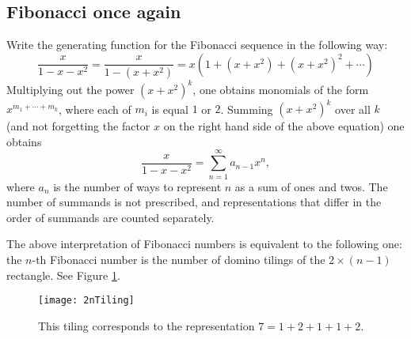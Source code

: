 \subsection{Fibonacci once again}
Write the generating function for the Fibonacci sequence in the following way:
\[
\frac{x}{1-x-x^2} = \frac{x}{1-(x+x^2)} = x( 1 + (x+x^2) + (x+x^2)^2 + \cdots)
\]
Multiplying out the power $(x+x^2)^k$, one obtains monomials of the form $x^{m_1+\cdots+m_k}$,
where each of $m_i$ is equal $1$ or $2$.
Summing $(x+x^2)^k$ over all $k$ (and not forgetting the factor $x$ on the right hand side of the above equation) one obtains
\[
\frac{x}{1-x-x^2} = \sum_{n=1}^\infty a_{n-1} x^n,
\]
where $a_n$ is the number of ways to represent $n$ as a sum of ones and twos.
The number of summands is not prescribed, and representations that differ in the order of summands are counted separately.

The above interpretation of Fibonacci numbers is equivalent to the following one:
the $n$-th Fibonacci number is the number of domino tilings of the $2 \times (n-1)$ rectangle.
See Figure \ref{fig:FibDomino}.

\begin{figure}[ht]
\begin{center}
\texttt{[image: 2nTiling]}
\end{center}
\caption{This tiling corresponds to the representation $7 = 1 + 2 + 1 + 1 + 2$.}
\label{fig:FibDomino}
\end{figure}


